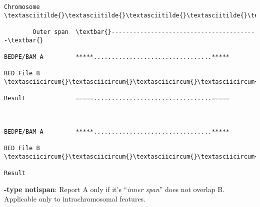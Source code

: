 \documentclass[letterpaper,10pt,english]{sphinxmanual}
\begin{document}
\begin{Verbatim}[commandchars=\\\{\}]
Chromosome  \textasciitilde{}\textasciitilde{}\textasciitilde{}\textasciitilde{}\textasciitilde{}\textasciitilde{}\textasciitilde{}\textasciitilde{}\textasciitilde{}\textasciitilde{}\textasciitilde{}\textasciitilde{}\textasciitilde{}\textasciitilde{}\textasciitilde{}\textasciitilde{}\textasciitilde{}\textasciitilde{}\textasciitilde{}\textasciitilde{}\textasciitilde{}\textasciitilde{}\textasciitilde{}\textasciitilde{}\textasciitilde{}\textasciitilde{}\textasciitilde{}\textasciitilde{}\textasciitilde{}\textasciitilde{}\textasciitilde{}\textasciitilde{}\textasciitilde{}\textasciitilde{}\textasciitilde{}\textasciitilde{}\textasciitilde{}\textasciitilde{}\textasciitilde{}\textasciitilde{}\textasciitilde{}\textasciitilde{}\textasciitilde{}\textasciitilde{}\textasciitilde{}\textasciitilde{}\textasciitilde{}\textasciitilde{}\textasciitilde{}\textasciitilde{}\textasciitilde{}\textasciitilde{}\textasciitilde{}\textasciitilde{}\textasciitilde{}\textasciitilde{}\textasciitilde{}\textasciitilde{}\textasciitilde{}\textasciitilde{}\textasciitilde{}\textasciitilde{}\textasciitilde{}\textasciitilde{}

        Outer span  \textbar{}-----------------------------------------\textbar{}

BEDPE/BAM A         *****.................................*****

BED File B             \textasciicircum{}\textasciicircum{}\textasciicircum{}\textasciicircum{}\textasciicircum{}\textasciicircum{}\textasciicircum{}\textasciicircum{}\textasciicircum{}\textasciicircum{}\textasciicircum{}\textasciicircum{}

Result              =====.................................=====



BEDPE/BAM A         *****.................................*****

BED File B     \textasciicircum{}\textasciicircum{}\textasciicircum{}\textasciicircum{}

Result
\end{Verbatim}

\textbf{-type notispan}: Report A only if it's ``\emph{inner span}'' does not overlap B. Applicable only to intrachromosomal
features.
\end{document}
